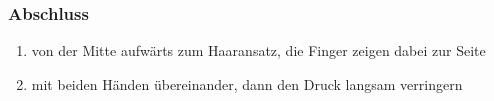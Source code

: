 \subsubsection{Abschluss}
\begin{enumerate}
	\item {} von der Mitte aufwärts zum Haaransatz, die Finger zeigen dabei zur Seite
	\item {} mit beiden Händen übereinander, dann den Druck langsam verringern
\end{enumerate}
